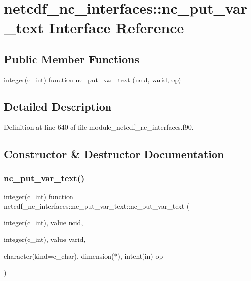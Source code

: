 \hypertarget{interfacenetcdf__nc__interfaces_1_1nc__put__var__text}{}\section{netcdf\+\_\+nc\+\_\+interfaces\+:\+:nc\+\_\+put\+\_\+var\+\_\+text Interface Reference}
\label{interfacenetcdf__nc__interfaces_1_1nc__put__var__text}
\subsection*{Public Member Functions}
\begin{DoxyCompactItemize}
\item 
integer(c\+\_\+int) function \hyperlink{interfacenetcdf__nc__interfaces_1_1nc__put__var__text_ae4459ed93d01d40b8037d5f1bbb24b8a}{nc\+\_\+put\+\_\+var\+\_\+text} (ncid, varid, op)
\end{DoxyCompactItemize}


\subsection{Detailed Description}


Definition at line 640 of file module\+\_\+netcdf\+\_\+nc\+\_\+interfaces.\+f90.



\subsection{Constructor \& Destructor Documentation}
\mbox{\label{interfacenetcdf__nc__interfaces_1_1nc__put__var__text_ae4459ed93d01d40b8037d5f1bbb24b8a}} 
\subsubsection{\texorpdfstring{nc\+\_\+put\+\_\+var\+\_\+text()}{nc\_put\_var\_text()}}
{\footnotesize\ttfamily integer(c\+\_\+int) function netcdf\+\_\+nc\+\_\+interfaces\+::nc\+\_\+put\+\_\+var\+\_\+text\+::nc\+\_\+put\+\_\+var\+\_\+text (\begin{DoxyParamCaption}\item[{integer(c\+\_\+int), value}]{ncid,  }\item[{integer(c\+\_\+int), value}]{varid,  }\item[{character(kind=c\+\_\+char), dimension($\ast$), intent(in)}]{op }\end{DoxyParamCaption})}



